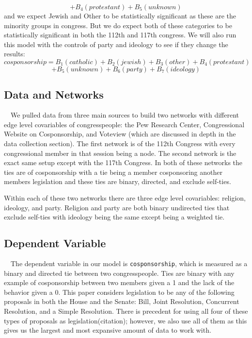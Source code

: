 \documentclass[Royal,times,sageh]{sagej}
\begin{document}
\[
+ B_4(protestant )+ B_5(unknown)
\] and we expect Jewish and Other to be statistically significant as
these are the minority groups in congress. But we do expect both of
these categories to be statistically significant in both the 112th and
117th congress. We will also run this model with the controls of party
and ideology to see if they change the results: \[
cosponsorship = B_1(catholic) + B_2(jewish) + B_3(other) + B_4(protestant )
\] \[
+ B_5(unknown) + B_6(party) + B_7(ideology)
\]

\hypertarget{data-and-networks}{%
\subsection{Data and Networks}\label{data-and-networks}}

\doublespacing

~~We pulled data from three main sources to build two networks with
different edge level covariables of congresspeople: the Pew Research
Center, Congressional Website on Cosponsorship, and Voteview (which are
discussed in depth in the data collection section). The first network is
of the 112th Congress with every congressional member in that session
being a node. The second network is the exact same setup except with the
117th Congress. In both of these networks the ties are of cosponsorship
with a tie being a member cosponsoring another members legislation and
these ties are binary, directed, and exclude self-ties.

Within each of these two networks there are three edge level
covariables: religion, ideology, and party. Religion and party are both
binary undirected ties that exclude self-ties with ideology being the
same except being a weighted tie.

\hypertarget{dependent-variable}{%
\subsection{Dependent Variable}\label{dependent-variable}}

\doublespacing

~~The dependent variable in our model is \texttt{cosponsorship}, which
is measured as a binary and directed tie between two congresspeople.
Ties are binary with any example of cosponsorship between two members
given a 1 and the lack of the behavior given a 0. This paper considers
legislation to be any of the following proposals in both the House and
the Senate: Bill, Joint Resolution, Concurrent Resolution, and a Simple
Resolution. There is precedent for using all four of these types of
proposals as legislation(citation); however, we also use all of them as
this gives us the largest and most expansive amount of data to work
with.
\end{document}
